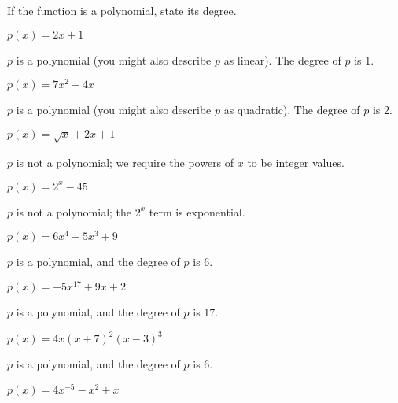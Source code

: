 \begin{exercises}
\begin{problem}
 	If the function is a polynomial, state its degree.
 	\begin{multicols}{3}
 		\begin{subproblem}
 			$p(x)=2x+1$
 			\begin{shortsolution}
 				$p$ is a polynomial (you might also describe $p$ as linear). The degree of $p$ is 1.
 			\end{shortsolution}
 		\end{subproblem}
 		\begin{subproblem}
 			$p(x)=7x^2+4x$
 			\begin{shortsolution}
 				$p$ is a polynomial (you might also describe $p$ as quadratic). The degree of $p$ is 2.
 			\end{shortsolution}
 		\end{subproblem}
 		\begin{subproblem}
 			$p(x)=\sqrt{x}+2x+1$
 			\begin{shortsolution}
 				$p$ is not a polynomial; we require the powers of $x$ to be integer values.
 			\end{shortsolution}
 		\end{subproblem}
 		\begin{subproblem}
 			$p(x)=2^x-45$
 			\begin{shortsolution}
 				$p$ is not a polynomial; the $2^x$ term is exponential.
 			\end{shortsolution}
 		\end{subproblem}
 		\begin{subproblem}
 			$p(x)=6x^4-5x^3+9$
 			\begin{shortsolution}
 				$p$ is a polynomial, and the degree of $p$ is $6$.
 			\end{shortsolution}
 		\end{subproblem}
 		\begin{subproblem}
 			$p(x)=-5x^{17}+9x+2$
 			\begin{shortsolution}
 				$p$ is a polynomial, and the degree of $p$ is 17.
 			\end{shortsolution}
 		\end{subproblem}
 		\begin{subproblem}
 			$p(x)=4x(x+7)^2(x-3)^3$
 			\begin{shortsolution}
 				$p$ is a polynomial, and the degree of $p$ is $6$.
 			\end{shortsolution}
 		\end{subproblem}
 		\begin{subproblem}
 			$p(x)=4x^{-5}-x^2+x$

\end{subproblem}
\end{multicols}
\end{problem}
\end{exercises}

